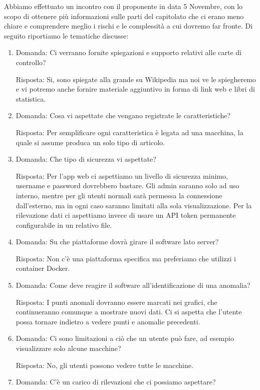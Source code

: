 \documentclass[12pt]{article}
\begin{document}
Abbiamo effettuato un incontro con il proponente in data 5 Novembre, con lo scopo di ottenere più informazioni sulle parti del capitolato che ci erano meno chiare e comprendere meglio i rischi e le complessità a cui dovremo far fronte. Di seguito riportiamo le tematiche discusse:
\begin{enumerate}
    \item {
        Domanda: Ci verranno fornite spiegazioni e supporto relativi alle carte di controllo?
        
        Risposta: Si, sono spiegate alla grande su Wikipedia ma noi ve le spiegheremo e vi potremo anche fornire materiale aggiuntivo in forma di link web e libri di statistica. 
    }
    \item {
        Domanda: Cosa vi aspettate che vengano registrate le caratteristiche?
        
        Risposta: Per semplificare ogni caratteristica è legata ad una macchina, la quale si assume produca un solo tipo di articolo.
    }
    \item {
        Domanda: Che tipo di sicurezza vi aspettate?
        
        Risposta: Per l'app web ci aspettiamo un livello di sicurezza minimo, username e password dovrebbero bastare. Gli admin saranno solo ad uso interno, mentre per gli utenti normali sarà permessa la connessione dall'esterno, ma in ogni caso saranno limitati alla sola visualizzazione. Per la rilevazione dati ci aspettiamo invece di usare un API token permanente configurabile in un relativo file. 
    }
    \item {
        Domanda: Su che piattaforme dovrà girare il software lato server?
        
        Risposta: Non c'è una piattaforma specifica ma preferiamo che utilizzi i container Docker.
    }
    \item {
        Domanda: Come deve reagire il software all'identificazione di una anomalia?
        
        Risposta: I punti anomali dovranno essere marcati nei grafici, che continueranno comunque a mostrare nuovi dati. Ci si aspetta che l'utente possa tornare indietro a vedere punti e anomalie precedenti.
    }
    \item {
        Domanda: Ci sono limitazioni a ciò che un utente può fare, ad esempio visualizzare solo alcune macchine?
        
        Risposta: No, gli utenti possono vedere tutte le macchine.
    }
    \item {
        Domanda: C'è un carico di rilevazioni che ci possiamo aspettare?
        
}
\end{enumerate}
\end{document}
